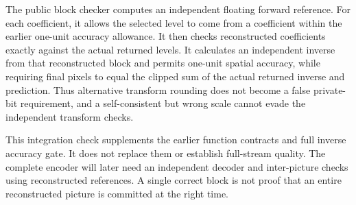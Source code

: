 The public block checker computes an independent floating forward reference.
For each coefficient, it allows the selected level to come from a coefficient
within the earlier one-unit accuracy allowance. It then checks reconstructed
coefficients exactly against the actual returned levels. It calculates an
independent inverse from that reconstructed block and permits one-unit spatial
accuracy, while requiring final pixels to equal the clipped sum of the actual
returned inverse and prediction. Thus alternative transform rounding does not
become a false private-bit requirement, and a self-consistent but wrong scale
cannot evade the independent transform checks.

This integration check supplements the earlier function contracts and full
inverse accuracy gate. It does not replace them or establish full-stream quality.
The complete encoder will later need an independent decoder and inter-picture
checks using reconstructed references. A single correct block is not proof that
an entire reconstructed picture is committed at the right time.
